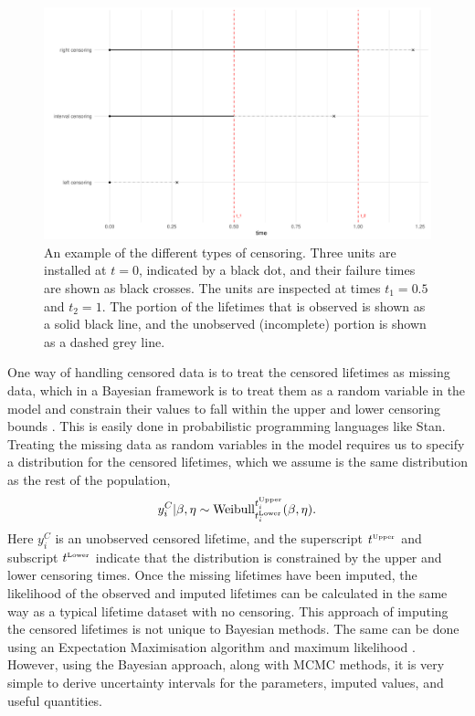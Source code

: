 \begin{figure}[h]
    \centering
    \includegraphics[width=1\textwidth]{./figures/censoring_example.pdf}
    \caption{An example of the different types of censoring. Three units are installed at $t = 0$, indicated by a black dot, and their failure times are shown as black crosses. The units are inspected at times $t_1 = 0.5$ and $t_2 = 1$. The portion of the lifetimes that is observed is shown as a solid black line, and the unobserved (incomplete) portion is shown as a dashed grey line.}
    \label{fig:cense_examp}
\end{figure}

One way of handling censored data is to treat the censored lifetimes as missing data, which in a Bayesian framework is to treat them as a random variable in the model \citep[p.211]{reich2019} and constrain their values to fall within the upper and lower censoring bounds \citep{stan_user_guide2024}. This is easily done in probabilistic programming languages like Stan. Treating the missing data as random variables in the model requires us to specify a distribution for the censored lifetimes, which we assume is the same distribution as the rest of the population,
\begin{equation}
    \label{eq:impute-cens}
    y^C_i|\beta, \eta \sim \hbox{Weibull}^{t^{\hbox{\tiny{Upper}}}_i}_{t^{\hbox{\tiny{Lower}}}_i}(\beta, \eta).
\end{equation}
Here $y^C_i$ is an unobserved censored lifetime, and the superscript $t^{\hbox{\tiny{Upper}}}$ and subscript $t^{\hbox{\tiny{Lower}}}$ indicate that the distribution is constrained by the upper and lower censoring times. Once the missing lifetimes have been imputed, the likelihood of the observed and imputed lifetimes can be calculated in the same way as a typical lifetime dataset with no censoring. This approach of imputing the censored lifetimes is not unique to Bayesian methods. The same can be done using an Expectation Maximisation algorithm and maximum likelihood \citep{mitra2013}. However, using the Bayesian approach, along with MCMC methods, it is very simple to derive uncertainty intervals for the parameters, imputed values, and useful quantities.

